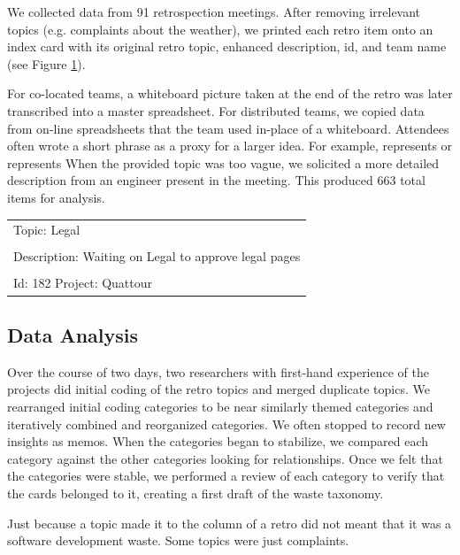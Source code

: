 We collected data from 91 retrospection meetings. After removing irrelevant topics (e.g. complaints about the weather), we printed each retro item onto an index card with its original retro topic, enhanced description, id, and team name (see Figure \ref{exampleRetroTopicl}).

For co-located teams, a whiteboard picture taken at the end of the retro was later transcribed into a master spreadsheet. For distributed teams, we copied data from on-line spreadsheets that the team used in-place of a whiteboard. Attendees often wrote a short phrase as a proxy for a larger idea. For example,  represents  or  represents  When the provided topic was too vague, we solicited a more detailed description from an engineer present in the meeting. This produced 663 total items for analysis. 

\begin{table}[t]
\renewcommand{\arraystretch}{1.5}
\centering
{}
\label{exampleRetroTopicl}
\begin{tabular}{|l|}
\hline
Topic: Legal \\ \\ Description: Waiting on Legal to approve legal pages \\ \\ Id: 182 Project: Quattour\\ \hline
\end{tabular}
\end{table}
\subsection{Data Analysis}
Over the course of two days, two researchers with first-hand experience of the projects did initial coding of the retro topics and merged duplicate topics. We rearranged initial coding categories to be near similarly themed categories and iteratively combined and reorganized categories. We often stopped to record new insights as memos. When the categories began to stabilize, we compared each category against the other categories looking for relationships. Once we felt that the categories were stable, we performed a review of each category to verify that the cards belonged to it, creating a first draft of the waste taxonomy.

Just because a topic made it to the  column of a retro did not meant that it was a software development waste. Some topics were just complaints.

